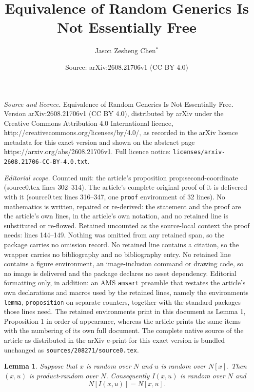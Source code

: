 \documentclass[10pt,a4paper]{amsart}
\title{Equivalence of Random Generics Is Not Essentially Free}
\author{Jason Zesheng Chen$^\ast$}
\date{Source: arXiv:2608.21706v1 (CC BY 4.0)}
\newtheorem{lemma}{Lemma}
\begin{document}
\maketitle

\noindent\emph{Source and licence.} Equivalence of Random Generics Is Not Essentially Free. Version arXiv:2608.21706v1 (CC BY 4.0), distributed by arXiv under the Creative Commons Attribution 4.0 International licence, http://creativecommons.org/licenses/by/4.0/, as recorded in the arXiv licence metadata for this exact version and shown on the abstract page https://arxiv.org/abs/2608.21706v1. Full licence notice: \texttt{licenses/arxiv-2608.21706-CC-BY-4.0.txt}.\par\smallskip

\noindent\textit{Editorial scope.} Counted unit: the article's proposition prop:second-coordinate (source0.tex lines 302--314). The article's complete original proof of it is delivered with it (source0.tex lines 316--347, one \texttt{proof} environment of 32 lines). No mathematics is written, repaired or re-derived: the statement and the proof are the article's own lines, in the article's own notation, and no retained line is substituted or re-flowed.  Retained uncounted as the source-local context the proof needs: lines 144--149.  Nothing was omitted from any retained span, so the package carries no omission record.  No retained line contains a citation, so the wrapper carries no bibliography and no bibliography entry.  No retained line contains a figure environment, an image-inclusion command or drawing code, so no image is delivered and the package declares no asset dependency.  Editorial formatting only, in addition: an AMS \texttt{amsart} preamble that restates the article's own declarations and macros used by the retained lines, namely the environments \texttt{lemma}, \texttt{proposition} on separate counters, together with the standard packages those lines need.  The retained environments print in this document as Lemma 1, Proposition 1 in order of appearance, whereas the article prints the same items with the numbering of its own full document.  The complete native source of the article as distributed in the arXiv e-print for this exact version is bundled unchanged as \texttt{sources/208271/source0.tex}.
\begin{lemma}\label{lem:two-step}
Suppose that $x$ is random over $N$ and $u$ is random over $N[x]$.  Then $(x,u)$ is product-random over $N$.  Consequently $I(x,u)$ is random over $N$ and
\[
 N[I(x,u)]=N[x,u].
\]
\end{lemma}
\end{document}
